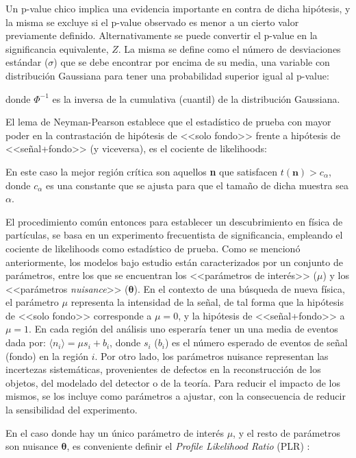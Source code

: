 Un p-value chico implica una evidencia importante en contra de dicha hipótesis, y la misma se excluye si el p-value observado es menor a un cierto valor previamente definido.  Alternativamente se puede convertir el p-value en la significancia equivalente, $Z$. La misma se define como el número de desviaciones estándar ($\sigma$) que se debe encontrar por encima de su media, una variable con distribución Gaussiana para tener una probabilidad superior igual al p-value:


donde $\Phi^{-1}$ es la inversa de la cumulativa (cuantil) de la distribución Gaussiana. 



El lema de Neyman-Pearson \cite{10.2307/91247} establece que el estadístico de prueba con mayor poder en la contrastación de hipótesis de <<solo fondo>> frente a hipótesis de <<señal+fondo>> (y viceversa), es el cociente de likelihoods:



En este caso la mejor región crítica son aquellos \textbf{n} que satisfacen $t(\textbf{n})>c_\alpha$, donde $c_\alpha$ es una constante que se ajusta para que el tamaño de dicha muestra sea $\alpha$.

El procedimiento común entonces para establecer un descubrimiento en física de partículas, se basa en un experimento frecuentista de significancia, empleando el cociente de likelihoods como estadístico de prueba. Como se mencionó anteriormente, los modelos bajo estudio están caracterizados por un conjunto de parámetros, entre los que se encuentran los <<parámetros de interés>> ($\mu$) y los <<parámetros \textit{nuisance}>> ($\bm{\theta}$). 
En el contexto de una búsqueda de nueva física, el parámetro $\mu$ representa la intensidad de la señal, de tal forma que la hipótesis de <<solo fondo>> corresponde a $\mu = 0$, y la hipótesis de <<señal+fondo>> a $\mu = 1$. En cada región del análisis uno esperaría tener un una media de eventos dada por: $\langle n_i \rangle = \mu s_i + b_i$, donde $s_i$ ($b_i$) es el número esperado de eventos de señal (fondo) en la región $i$. Por otro lado, los parámetros nuisance representan las incertezas sistemáticas, provenientes de defectos en la reconstrucción de los objetos, del modelado del detector o de la teoría. Para reducir el impacto de los mismos, se los incluye como parámetros a ajustar, con la consecuencia de reducir la sensibilidad del experimento.

En el caso donde hay un único parámetro de interés $\mu$, y el resto de parámetros son nuisance $\bm{\theta}$, es conveniente definir el \textit{Profile Likelihood Ratio} (PLR) \cite{Cowan:2010js}:



